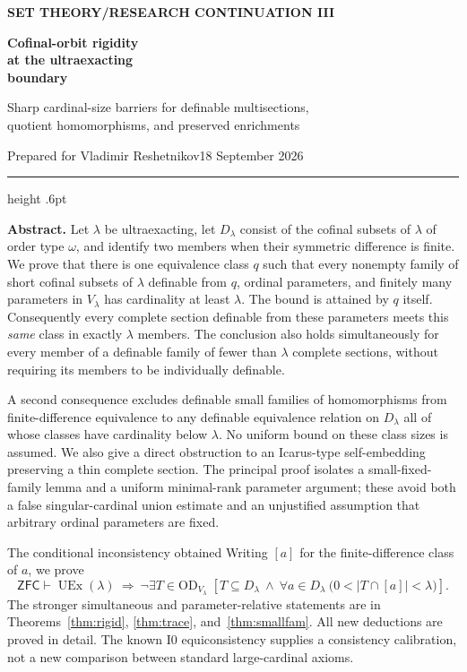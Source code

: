 \documentclass[11pt,letterpaper]{article}
\theoremstyle{definition}
\numberwithin{equation}{section}
\newcommand{\ZFC}{\mathsf{ZFC}}
\newcommand{\OD}{\mathrm{OD}}
\newcommand{\UEx}{\operatorname{UEx}}
\newcommand{\Izero}{\mathrm{I0}}
\newcommand{\D}{D_\lambda}
\newcommand{\ODlow}{\OD_{V_\lambda}}
\begin{document}
\thispagestyle{empty}
{\sffamily\bfseries\small\color{Olive}SET THEORY\quad /\quad RESEARCH CONTINUATION III}

\vspace{13pt}
{\fontsize{28}{31}\selectfont\bfseries\color{Forest}Cofinal-orbit rigidity\\ at the ultraexacting\\ boundary\par}
\vspace{10pt}
{\fontsize{14}{18}\selectfont Sharp cardinal-size barriers for definable multisections,\\ quotient homomorphisms, and preserved enrichments\par}
\vspace{14pt}
{\color{Muted}Prepared for Vladimir Reshetnikov\hfill 18 September 2026\par}
\vspace{3pt}
{\color{Sage}\hrule height .6pt}
\vspace{12pt}

\textbf{Abstract.} Let $\lambda$ be ultraexacting, let $\D$ consist of the cofinal subsets of $\lambda$ of order type $\omega$, and identify two members when their symmetric difference is finite. We prove that there is one equivalence class $q$ such that every nonempty family of short cofinal subsets of $\lambda$ definable from $q$, ordinal parameters, and finitely many parameters in $V_\lambda$ has cardinality at least $\lambda$. The bound is attained by $q$ itself. Consequently every complete section definable from these parameters meets this \emph{same} class in exactly $\lambda$ members. The conclusion also holds simultaneously for every member of a definable family of fewer than $\lambda$ complete sections, without requiring its members to be individually definable.

A second consequence excludes definable small families of homomorphisms from finite-difference equivalence to any definable equivalence relation on $\D$ all of whose classes have cardinality below $\lambda$. No uniform bound on these class sizes is assumed. We also give a direct obstruction to an Icarus-type self-embedding preserving a thin complete section. The principal proof isolates a small-fixed-family lemma and a uniform minimal-rank parameter argument; these avoid both a false singular-cardinal union estimate and an unjustified assumption that arbitrary ordinal parameters are fixed.

\begin{assessment}{The conditional inconsistency obtained}
Writing $[a]$ for the finite-difference class of $a$, we prove
\[
\ZFC\vdash\UEx(\lambda)\ \Longrightarrow\
\neg\exists T\in\ODlow\;
\left[T\subseteq\D\ \wedge\
\forall a\in\D\ \bigl(0<|T\cap[a]|<\lambda\bigr)\right].
\]
The stronger simultaneous and parameter-relative statements are in Theorems~\ref{thm:rigid}, \ref{thm:trace}, and~\ref{thm:smallfam}. All new deductions are proved in detail. The known $\Izero$ equiconsistency supplies a consistency calibration, not a new comparison between standard large-cardinal axioms.
\end{assessment}
\end{document}

